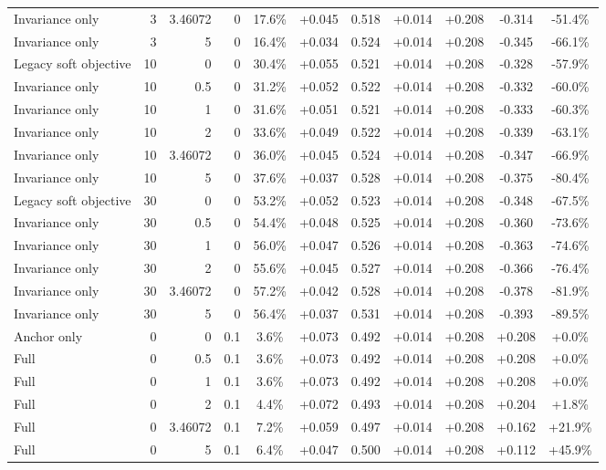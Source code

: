 \begin{table}[htbp]
\begin{tabular}{lrrrccccccc}
Invariance only & 3 & 3.46072 & 0 & 17.6\% & +0.045 & 0.518 & +0.014 & +0.208 & -0.314 & -51.4\% \\
Invariance only & 3 & 5 & 0 & 16.4\% & +0.034 & 0.524 & +0.014 & +0.208 & -0.345 & -66.1\% \\
Legacy soft objective & 10 & 0 & 0 & 30.4\% & +0.055 & 0.521 & +0.014 & +0.208 & -0.328 & -57.9\% \\
Invariance only & 10 & 0.5 & 0 & 31.2\% & +0.052 & 0.522 & +0.014 & +0.208 & -0.332 & -60.0\% \\
Invariance only & 10 & 1 & 0 & 31.6\% & +0.051 & 0.521 & +0.014 & +0.208 & -0.333 & -60.3\% \\
Invariance only & 10 & 2 & 0 & 33.6\% & +0.049 & 0.522 & +0.014 & +0.208 & -0.339 & -63.1\% \\
Invariance only & 10 & 3.46072 & 0 & 36.0\% & +0.045 & 0.524 & +0.014 & +0.208 & -0.347 & -66.9\% \\
Invariance only & 10 & 5 & 0 & 37.6\% & +0.037 & 0.528 & +0.014 & +0.208 & -0.375 & -80.4\% \\
Legacy soft objective & 30 & 0 & 0 & 53.2\% & +0.052 & 0.523 & +0.014 & +0.208 & -0.348 & -67.5\% \\
Invariance only & 30 & 0.5 & 0 & 54.4\% & +0.048 & 0.525 & +0.014 & +0.208 & -0.360 & -73.6\% \\
Invariance only & 30 & 1 & 0 & 56.0\% & +0.047 & 0.526 & +0.014 & +0.208 & -0.363 & -74.6\% \\
Invariance only & 30 & 2 & 0 & 55.6\% & +0.045 & 0.527 & +0.014 & +0.208 & -0.366 & -76.4\% \\
Invariance only & 30 & 3.46072 & 0 & 57.2\% & +0.042 & 0.528 & +0.014 & +0.208 & -0.378 & -81.9\% \\
Invariance only & 30 & 5 & 0 & 56.4\% & +0.037 & 0.531 & +0.014 & +0.208 & -0.393 & -89.5\% \\
Anchor only & 0 & 0 & 0.1 & 3.6\% & +0.073 & 0.492 & +0.014 & +0.208 & +0.208 & +0.0\% \\
Full & 0 & 0.5 & 0.1 & 3.6\% & +0.073 & 0.492 & +0.014 & +0.208 & +0.208 & +0.0\% \\
Full & 0 & 1 & 0.1 & 3.6\% & +0.073 & 0.492 & +0.014 & +0.208 & +0.208 & +0.0\% \\
Full & 0 & 2 & 0.1 & 4.4\% & +0.072 & 0.493 & +0.014 & +0.208 & +0.204 & +1.8\% \\
Full & 0 & 3.46072 & 0.1 & 7.2\% & +0.059 & 0.497 & +0.014 & +0.208 & +0.162 & +21.9\% \\
Full & 0 & 5 & 0.1 & 6.4\% & +0.047 & 0.500 & +0.014 & +0.208 & +0.112 & +45.9\% \\

\end{tabular}
\end{table}
